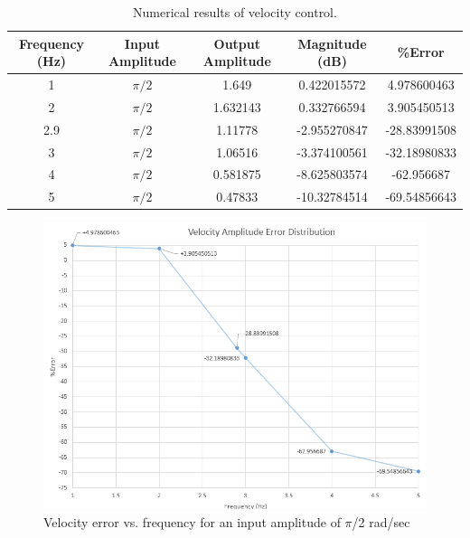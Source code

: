 \documentclass{article}
\theoremstyle{plain}
\theoremstyle{definition}
\theoremstyle{remark}
\begin{document}
\begin{table}[htb]
    \begin{tabular}{|c|c|c|c|c|}
        \hline
        Frequency (Hz) & Input Amplitude & Output Amplitude & Magnitude (dB) & \%Error      \\ \hline
        1              & $\pi/2$         & 1.649            & 0.422015572    & 4.978600463  \\ 
        2              & $\pi/2$         & 1.632143         & 0.332766594    & 3.905450513  \\ 
        2.9            & $\pi/2$         & 1.11778          & -2.955270847   & -28.83991508 \\ 
        3              & $\pi/2$         & 1.06516          & -3.374100561   & -32.18980833 \\ 
        4              & $\pi/2$         & 0.581875         & -8.625803574   & -62.956687   \\ 
        5              & $\pi/2$         & 0.47833          & -10.32784514   & -69.54856643 \\
        \hline
    \end{tabular}
    \caption{Numerical results of velocity control.}
    \label{q6_table}
\end{table}

\begin{figure}[htb]
\begin{center}
\includegraphics[width = 14cm]{VelocityControl_Error.png}
\caption{Velocity error vs. frequency for an input amplitude of $\pi$/2 rad/sec}
\label{VelFreqError}
\end{center}
\end{figure}
\end{document}
